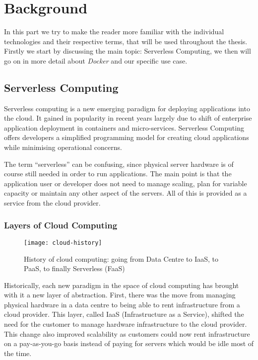 \section{Background}

In this part we try to make the reader more familiar with the individual technologies and their
respective terms, that will be used throughout the thesis. Firstly we start by discussing the main
topic: Serverless Computing, we then will go on in more detail about \textit{Docker} and our
specific use case.

\subsection{Serverless Computing}

Serverless computing is a new emerging paradigm for deploying applications into the cloud. It gained
in popularity in recent years largely due to shift of enterprise application deployment in
containers and micro-services. Serverless Computing offers developers a simplified programming model
for creating cloud applications while minimising operational concerns. \cite{servprog}

The term “serverless” can be confusing, since physical server hardware is of course still needed in
order to run applications. The main point is that the application user or developer does not need to
manage scaling, plan for variable capacity or maintain any other aspect of the servers. All of this
is provided as a service from the cloud provider. \cite{wikiservcomp}

\subsubsection{Layers of Cloud Computing}

\begin{figure}[H]
  \centering
  \texttt{[image: cloud-history]}
  \caption{History of cloud computing: going from Data Centre to IaaS, to PaaS, to finally
  Serverless (FaaS) \cite{layercloudcomp}}
\end{figure}

Historically, each new paradigm in the space of cloud computing has brought with it a new layer of
abstraction. First, there was the move from managing physical hardware in a data centre to being
able to rent infrastructure from a cloud provider. This layer, called IaaS (Infrastructure as a
Service), shifted the need for the customer to manage hardware infrastructure to the cloud
provider. This change also improved scalability as customers could now rent infrastructure on a
pay-as-you-go basis instead of paying for servers which would be idle most of the time.

